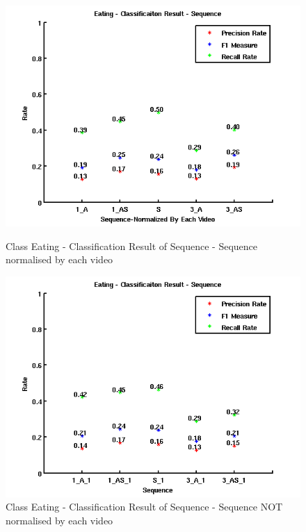 \begin{figure}[ht]
\centering
\begin{minipage}{.5\textwidth}
  \centering
  \captionsetup{justification=centering,margin=1cm}
  \includegraphics[width=\linewidth]{imgs/Result_Eating_Sequence.png}
  \caption{Class Eating - Classification Result of Sequence - Sequence normalised by each video}
  \label{fig:RES}
\end{minipage}%
\begin{minipage}{.5\textwidth}
  \centering
  \captionsetup{justification=centering,margin=1cm}
  \includegraphics[width=\linewidth]{imgs/Result_Eating_Sequence_1.png}
  \caption{Class Eating - Classification Result of Sequence - Sequence NOT normalised by each video}
  \label{fig:RES1}
\end{minipage}
\end{figure}
